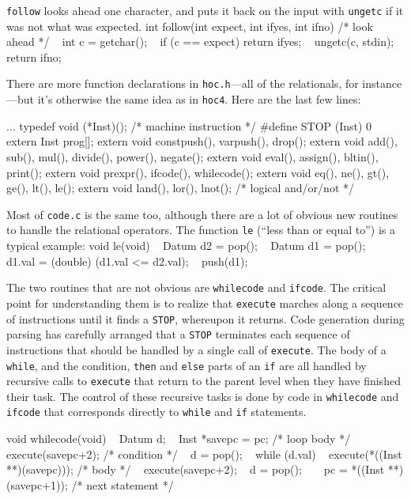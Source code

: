 \noindent
{\tt follow} looks ahead one character, and puts it back
on the input with {\tt ungetc} if it was not what was
expected.
\begincode
int follow(int expect, int ifyes, int ifno)  /* look ahead */
{
~       int c = getchar();
~       if (c == expect)  return ifyes;
~       ungetc(c, stdin); return ifno;
}
\endcode

There are more function declarations in {\tt hoc.h}---all of
the relationals, for instance---but it's otherwise the same
idea as in {\tt hoc4}. Here are the last few lines:

\begincode
...
typedef void (*Inst)();  /* machine instruction */
#define STOP (Inst) 0
\medbreak
extern  Inst prog[];
extern  void constpush(), varpush(), drop();
extern  void add(), sub(), mul(), divide(), power(), negate();
extern  void eval(), assign(), bltin(), print();
extern  void prexpr(), ifcode(), whilecode();
extern  void eq(), ne(), gt(), ge(), lt(), le();
extern  void land(), lor(), lnot();  /* logical and/or/not */
\endcode

\noindent
Most of {\tt code.c} is the same too, although there are a lot
of obvious new routines to handle the relational operators.
The function {\tt le} (``less than or equal to'') is a typical
example:
\begincode
void le(void)
{
~       Datum d2 = pop();
~       Datum d1 = pop();
~       d1.val = (double) (d1.val <= d2.val);
~       push(d1);
}
\endcode

The two routines that are not obvious are {\tt whilecode} and
{\tt ifcode}. The critical point for understanding them is to
realize that {\tt execute} marches along a sequence of
instructions until it finds a {\tt STOP}, whereupon it returns.
Code generation during parsing has carefully arranged that a
{\tt STOP} terminates each sequence of instructions that should
be handled by a single call of {\tt execute}. The body of a
{\tt while}, and the condition, {\tt then} and {\tt else} parts
of an {\tt if} are all handled by recursive calls to {\tt execute}
that return to the parent level when they have finished their task.
The control of these recursive tasks is done by code in
{\tt whilecode} and {\tt ifcode} that corresponds directly
to {\tt while} and {\tt if} statements.

\begincode
void whilecode(void)
{
~       Datum d;
~       Inst *savepc = pc;     /* loop body */
\smallbreak
~       execute(savepc+2);     /* condition */
~       d = pop();
~       while (d.val) {
~               execute(*((Inst **)(savepc)));  /* body */
~               execute(savepc+2);
~               d = pop();
~       }
~       pc = *((Inst **)(savepc+1));  /* next statement */
}
\endcode

